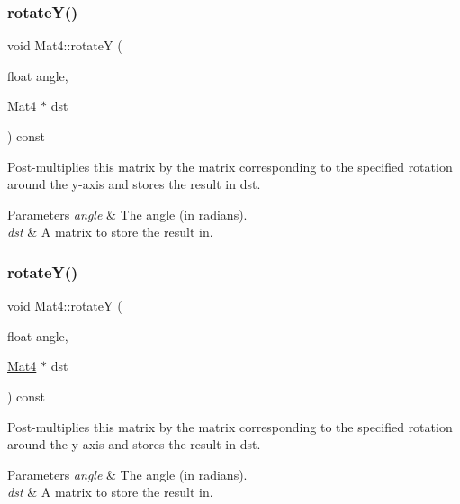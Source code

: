 \subsubsection{\texorpdfstring{rotate\+Y()}{rotateY()}\hspace{0.1cm}{\footnotesize\ttfamily [3/4]}}
{\footnotesize\ttfamily void Mat4\+::rotateY (\begin{DoxyParamCaption}\item[{float}]{angle,  }\item[{\hyperlink{classMat4}{Mat4} $\ast$}]{dst }\end{DoxyParamCaption}) const}

Post-\/multiplies this matrix by the matrix corresponding to the specified rotation around the y-\/axis and stores the result in dst.


\begin{DoxyParams}{Parameters}
{\em angle} & The angle (in radians). \\
\hline
{\em dst} & A matrix to store the result in. \\
\hline
\end{DoxyParams}
\mbox{\label{classMat4_a0a36c4dc24d143acfb8f03d8aa1ee164}} 
\subsubsection{\texorpdfstring{rotate\+Y()}{rotateY()}\hspace{0.1cm}{\footnotesize\ttfamily [4/4]}}
{\footnotesize\ttfamily void Mat4\+::rotateY (\begin{DoxyParamCaption}\item[{float}]{angle,  }\item[{\hyperlink{classMat4}{Mat4} $\ast$}]{dst }\end{DoxyParamCaption}) const}

Post-\/multiplies this matrix by the matrix corresponding to the specified rotation around the y-\/axis and stores the result in dst.


\begin{DoxyParams}{Parameters}
{\em angle} & The angle (in radians). \\
\hline
{\em dst} & A matrix to store the result in. \\
\hline
\end{DoxyParams}
\mbox{\label{classMat4_a31f8fbbe32864fef9477c4d520a4c365}} 
